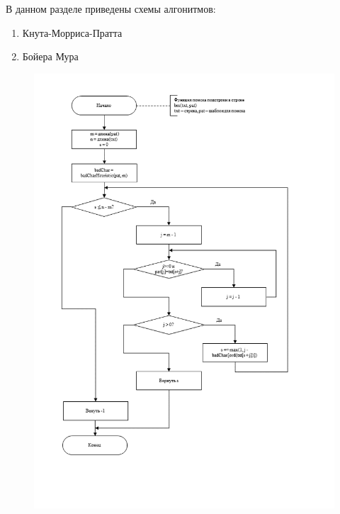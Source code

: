 \documentclass[../main.tex]{subfiles}
\begin{document}
	
	В данном разделе приведены схемы алгонитмов:
	\begin{enumerate}[1)]
		\item Кнута-Морриса-Пратта
		\item Бойера Мура
	\end{enumerate}

	\begin{figure}[H]
		\centering
		\includegraphics[scale=0.7 ]{src/img/bm-main}
		\caption{}
		\label{fig:bm-main}
	\end{figure}
	
\end{document}
